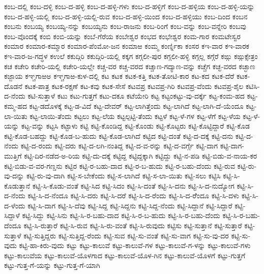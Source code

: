 ಕಂಬ-ದಲ್ಲಿ
ಕಂಬ-ದಳ್ಳಿ
ಕಂಬ-ದ-ಹಳ್ಳಿ
ಕಂಬ-ದ-ಹಳ್ಳಿ-ಗಳು
ಕಂಬ-ದ-ಹಳ್ಳಿಗೆ
ಕಂಬ-ದ-ಹಳ್ಳಿಯ
ಕಂಬ-ದ-ಹಳ್ಳಿ-ಯನ್ನು
ಕಂಬ-ದ-ಹಳ್ಳಿ-ಯಲ್ಲಿ
ಕಂಬ-ದ-ಹಳ್ಳಿ-ಯಲ್ಲಿ-ರುವ
ಕಂಬ-ದ-ಹಳ್ಳಿ-ಯಿಂದ
ಕಂಬ-ದ-ಹಳ್ಳಿಯು
ಕಂಬ-ದಿಂದ
ಕಂಬನ
ಕಂಬನು
ಕಂಬಯ್ಯ
ಕಂಬಯ್ಯ-ನನ್ನು
ಕಂಬಯ್ಯನು
ಕಂಬ-ರಾಜನು
ಕಂಬ-ರಿಂಗೆ
ಕಂಬ-ವನ್ನು
ಕಂಬ-ವನ್ನೇರಿ
ಕಂಬವು
ಕಂಬ-ವೊಂದಕ್ಕೆ
ಕಂಬಿ
ಕಂಬಿ-ಯನ್ನು
ಕಂಬೆ-ಗೆರೆಯ
ಕಂಬೇಶ್ವರ
ಕಂಭದ
ಕಂಭೇಶ್ವರ
ಕಂಮ-ಗಾರ
ಕಂಮಟೇಸ್ವರ
ಕಂಮಾರ
ಕಂಮಾರ-ಕಮ್ಮಾರ
ಕಂಮಾರ-ಪೆಂಮೋ-ಜನ
ಕಂಮಾಱ
ಕಂಮ್ಮ
ಕಂರ್ಣ್ನಿಕಾ
ಕಂಸರ
ಕಇ-ವಾರ
ಕಇ-ವಾರಕ
ಕಇ-ವಾರ-ಜ-ಗದ್ಧಳ
ಕಉಲೆ
ಕಕುದ್ಗಿರಿ
ಕಕುದ್ಗಿರಿ-ಯಲ್ಲಿ
ಕಕ್ಕಗ
ಕಗ್ಗಲೀ-ಪುರ
ಕಗ್ಗಲೀ-ಹಳ್ಳಿ
ಕಗ್ಗಲ್ಲ
ಕಗ್ಗೆರೆ
ಕಙ್ಗು
ಕಙ್ಗುಕ್ಸೇತ್ರಂ
ಕಚ
ಕಚೇರಿ
ಕಚೇರಿ-ಯಲ್ಲಿ
ಕಚೇರಿ-ಯಲ್ಲೇ
ಕಚ್ಚ-ವರ
ಕಚ್ಚ-ವರದ
ಕಚ್ಚಾಣ-ಗದ್ಯಾಣ-ವನ್ನು
ಕಚ್ಚೆಗ
ಕಚ್ಛ-ವರದ
ಕಚ್ಛಾಣ
ಕಜ್ಜಾಯ
ಕಞ್ಚಗಾಱಅ
ಕಞ್ಚಗಾಱ-ಕುಳ-ದಲ್ಲಿ
ಕಟ
ಕಟಕ
ಕಟಕ-ಕತ್ತಿ
ಕಟಕ-ತೋಟಿ-ಕಾರ
ಕಟ-ಕದ
ಕಟಕ-ದೆರೆ
ಕಟಕ-ದೊಡನೆ
ಕಟಕ-ಪಾತ್ರ
ಕಟಕ-ರಕ್ಷಣೆ
ಕಟ-ಕವು
ಕಟಕ-ಸೇಸೆ
ಕಟವಪ್ರ
ಕಟವಪ್ರ-ಗಿರಿ
ಕಟವಪ್ರ-ವೆಂದು
ಕಟವಪ್ರ-ಶೈಲ
ಕಟಿಸಿ-ದ-ನೆಂದು
ಕಟಿ-ಸುತ್ತಾಳೆ
ಕಟು
ಕಟು-ಗುತ್ತಗೆ
ಕಟು-ದಕೂ
ಕಟೆಯೇರಿ
ಕಟ್ಟ
ಕಟ್ಟಂಕಟ್ಟು-ವು-ದರ್ಕ್ಕೆ
ಕಟ್ಟ-ಕಂಮ-ಹದ
ಕಟ್ಟ-ಕಮ್ಮ-ಹದ
ಕಟ್ಟ-ಡದೊಳಕ್ಕೆ
ಕಟ್ಟ-ಡ-ವಿದೆ
ಕಟ್ಟ-ದೇವರ್
ಕಟ್ಟ-ಲಾಗಿತ್ತೆಂದು
ಕಟ್ಟ-ಲಾಗಿದೆ
ಕಟ್ಟ-ಲಾಗಿ-ದೆ-ಯೆಂದೂ
ಕಟ್ಟ-ಲಾ-ಯಿತು
ಕಟ್ಟ-ಲಾಯಿ-ತೆಂದು
ಕಟ್ಟಲು
ಕಟ್ಟ-ಲೆಯ
ಕಟ್ಟಲ್ಪಟ್ಟಿ-ತೆಂದು
ಕಟ್ಟಳೆ
ಕಟ್ಟ-ಳೆ-ಗಳ
ಕಟ್ಟ-ಳೆಗೆ
ಕಟ್ಟ-ಳೆಯ
ಕಟ್ಟ-ಳೆ-ಯನ್ನು
ಕಟ್ಟ-ವನ್ನು
ಕಟ್ಟಸಿ
ಕಟ್ಟಾಳು
ಕಟ್ಟಿ
ಕಟ್ಟಿ-ಕೊಂಡಿದ್ದ
ಕಟ್ಟಿ-ಕೊಂಡು
ಕಟ್ಟಿ-ಕೊಟ್ಟರು
ಕಟ್ಟಿ-ಕೊಟ್ಟಿದ್ದಾರೆ
ಕಟ್ಟಿ-ಕೊಡ
ಕಟ್ಟಿ-ಕೊಡ-ಬಹದ್ದು
ಕಟ್ಟಿ-ಕೊಡ-ಬ-ಹುದು
ಕಟ್ಟಿ-ಕೊಡ-ಲಾಗಿದೆ
ಕಟ್ಟಿದ
ಕಟ್ಟಿ-ದಂತೆ
ಕಟ್ಟಿ-ದ-ದಕ್ಕೆ
ಕಟ್ಟಿ-ದನು
ಕಟ್ಟಿ-ದ-ನೆಂದು
ಕಟ್ಟಿ-ದ-ರಂದು
ಕಟ್ಟಿ-ದರು
ಕಟ್ಟಿ-ದ-ಲಗಿ-ನಂತಿದ್ದ
ಕಟ್ಟಿ-ದ-ವ-ರನ್ನು
ಕಟ್ಟಿ-ದ-ವರ್ಗ್ಗೆ
ಕಟ್ಟಿ-ದಾಗ
ಕಟ್ಟಿ-ದಾಗ-ಮುತ್ತಿಗೆ
ಕಟ್ಟಿ-ದಿರ-ನಡೆದ-ಅ-ರಿಯ
ಕಟ್ಟಿ-ದು-ದಕ್ಕೆ
ಕಟ್ಟಿದ್ದ
ಕಟ್ಟಿದ್ದಕ್ಕಾಗಿ
ಕಟ್ಟಿದ್ದು
ಕಟ್ಟಿ-ನ-ಪಡಿ
ಕಟ್ಟಿ-ಬಿಡು-ವ-ನಾಯ-ಕರ
ಕಟ್ಟಿ-ಬಿಡು-ವ-ವರ-ಗಣ್ಡನು
ಕಟ್ಟಿರ
ಕಟ್ಟಿ-ರ-ಬಹು-ದಾದ
ಕಟ್ಟಿ-ರ-ಬ-ಹುದು
ಕಟ್ಟಿ-ರ-ಬಹು-ದೆಂದು
ಕಟ್ಟಿ-ರುವ
ಕಟ್ಟಿ-ರು-ವು-ದನ್ನು
ಕಟ್ಟಿ-ರು-ವು-ದಾಗಿ
ಕಟ್ಟಿ-ಸ-ಬೇಕೆಂದು
ಕಟ್ಟಿ-ಸ-ಲಾಗಿದೆ
ಕಟ್ಟಿ-ಸ-ಲಾ-ಯಿತು
ಕಟ್ಟಿ-ಸಲು
ಕಟ್ಟಿಸಿ
ಕಟ್ಟಿ-ಸಿ-ಕೊಡುತ್ತಾನೆ
ಕಟ್ಟಿ-ಸಿ-ಕೊಡು-ವಂತೆ
ಕಟ್ಟಿ-ಸಿದ
ಕಟ್ಟಿ-ಸಿದಂ
ಕಟ್ಟಿ-ಸಿ-ದಂತೆ
ಕಟ್ಟಿ-ಸಿ-ದನು
ಕಟ್ಟಿ-ಸಿ-ದ-ನುದ್ಯೋಗ
ಕಟ್ಟಿ-ಸಿ-ದ-ನೆಂದು
ಕಟ್ಟಿ-ಸಿ-ದ-ನೆಂದೂ
ಕಟ್ಟಿ-ಸಿ-ದರು
ಕಟ್ಟಿ-ಸಿ-ದರೆ
ಕಟ್ಟಿ-ಸಿ-ದ-ರೆಂದು
ಕಟ್ಟಿ-ಸಿ-ದ-ರೆೆಂದೂ
ಕಟ್ಟಿ-ಸಿ-ದಳು
ಕಟ್ಟಿ-ಸಿ-ದ-ಳೆಂದು
ಕಟ್ಟಿ-ಸಿ-ದಾಗ
ಕಟ್ಟಿ-ಸಿ-ದೆವು
ಕಟ್ಟಿ-ಸಿದ್ದ
ಕಟ್ಟಿ-ಸಿದ್ದನು
ಕಟ್ಟಿ-ಸಿದ್ದ-ನೆಂದು
ಕಟ್ಟಿ-ಸಿದ್ದಾನೆ
ಕಟ್ಟಿ-ಸಿದ್ದಾರೆ
ಕಟ್ಟಿ-ಸಿದ್ದಾಳೆ
ಕಟ್ಟಿ-ಸಿದ್ದು
ಕಟ್ಟಿ-ಸಿನು
ಕಟ್ಟಿ-ಸಿ-ರ-ಬಹು-ದಾದ
ಕಟ್ಟಿ-ಸಿ-ರ-ಬ-ಹುದು
ಕಟ್ಟಿ-ಸಿ-ರ-ಬಹು-ದೆಂದು
ಕಟ್ಟಿ-ಸಿ-ರ-ಬಹು-ದೆಂದೂ
ಕಟ್ಟಿ-ಸಿ-ರುತ್ತಾರೆ
ಕಟ್ಟಿ-ಸಿ-ರುವ
ಕಟ್ಟಿ-ಸಿ-ರು-ವಂತೆ
ಕಟ್ಟಿ-ಸಿ-ರುವುದು
ಕಟ್ಟಿಸು
ಕಟ್ಟಿ-ಸುತ್ತಾನೆ
ಕಟ್ಟಿ-ಸುತ್ತಾರೆ
ಕಟ್ಟಿ-ಸುತ್ತಾಳೆ
ಕಟ್ಟಿ-ಸುತ್ತಿದ್ದರು
ಕಟ್ಟಿ-ಸುತ್ತಿದ್ದ-ರೆಂದು
ಕಟ್ಟಿ-ಸುವ
ಕಟ್ಟಿ-ಸು-ವಂತೆ
ಕಟ್ಟಿ-ಸು-ವಾಗ
ಕಟ್ಟಿ-ಸು-ವು-ದರ
ಕಟ್ಟಿ-ಸು-ವುದು
ಕಟ್ಟಿ-ಹಾ-ಕಿರು-ವುದು
ಕಟ್ಟು
ಕಟ್ಟು-ಕಾಲುವೆ
ಕಟ್ಟು-ಕಾಲುವೆ-ಗಳ
ಕಟ್ಟು-ಕಾಲುವೆ-ಗ-ಳನ್ನು
ಕಟ್ಟು-ಕಾಲುವೆ-ಗಳು
ಕಟ್ಟು-ಕಾಲುವೆಯ
ಕಟ್ಟು-ಕಾಲುವೆ-ಯೊಳಗಾದ
ಕಟ್ಟು-ಕಾಲುವೆ-ಯೊಳ-ಗಿನ
ಕಟ್ಟು-ಕಾಲುವೆ-ಯೊಳಗೆ
ಕಟ್ಟು-ಗುತ್ತಗೆ
ಕಟ್ಟು-ಗುತ್ತ-ಗೆ-ಯನ್ನು
ಕಟ್ಟು-ಗುತ್ತ-ಗೆ-ಯಾಗಿ
